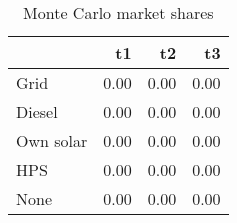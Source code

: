 \begin{table}[!ht]
	\centering
		\caption{Monte Carlo market shares}
\begin{tabular}{lrrr}
		\toprule
               &        t1&        t2&        t3\\
		\midrule
		           Grid&      0.00&      0.00&      0.00\\
		         Diesel&      0.00&      0.00&      0.00\\
		      Own solar&      0.00&      0.00&      0.00\\
		            HPS&      0.00&      0.00&      0.00\\
		           None&      0.00&      0.00&      0.00\\
		\bottomrule
	\end{tabular}
\end{table}
